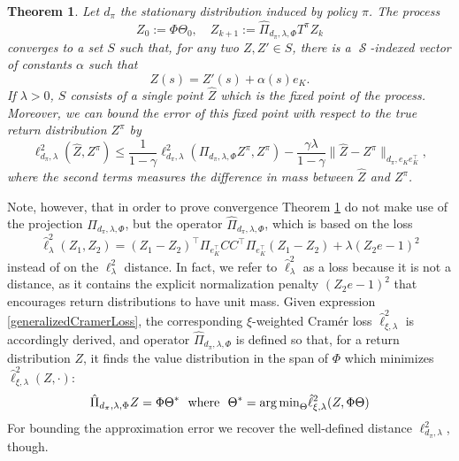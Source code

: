 \documentclass[12pt,a4paper,openright,twoside]{article}
\DeclareMathOperator*{\Sspace}{\mathcal{S}}
\numberwithin{equation}{section}
\newtheorem{theorem}{Theorem}[section]
\theoremstyle{definition}
\theoremstyle{remark}
\theoremstyle{plain}
\begin{document}
\begin{theorem} \label{convergenceLinearCDRL}
	Let $d_\pi$ the stationary distribution induced by policy $\pi$. The process
	\begin{equation*}
		Z_0 := \Phi \Theta_0, \quad Z_{k+1} := \hat{\Pi}_{d_\pi,\lambda,\Phi} T^\pi Z_k
	\end{equation*}
	converges to a set $S$ such that, for any two $Z, Z' \in S$, there is a $\Sspace$-indexed vector of constants $\alpha$ such that
	\begin{equation*}
		Z(s) = Z'(s) + \alpha(s)e_K.
	\end{equation*}
	If $\lambda > 0$, $S$ consists of a single point $\hat{Z}$ which is the fixed point of the process. Moreover, we can bound the error of this fixed point with respect to the true return distribution $Z^\pi$ by
	\begin{equation*}
		\ell^2_{d_\pi, \lambda} (\hat{Z}, Z^\pi) \leq \frac{1}{1-\gamma} \ell^2_{d_\pi, \lambda} (\Pi_{d_\pi,\lambda,\Phi} Z^\pi, Z^\pi) - \frac{\gamma \lambda}{1-\gamma} \| \hat{Z} - Z^\pi \|_{d_\pi, e_Ke_K^\top},
	\end{equation*}
	where the second terms measures the difference in mass between $\hat{Z}$ and $Z^\pi$.
\end{theorem}


Note, however, that in order to prove convergence Theorem \ref{convergenceLinearCDRL} do not make use of the projection $\Pi_{d_\pi,\lambda,\Phi}$, but the operator $\hat{\Pi}_{d_\pi,\lambda,\Phi}$, which is based on the loss
\begin{equation} \label{generalizedCramerLoss}
	\hat{\ell}_{\lambda}^2(Z_1,Z_2) = (Z_1 - Z_2)^\top \Pi_{e_K^\top} C C^\top \Pi_{e_K^\top} (Z_1 - Z_2) + \lambda (Z_2 e -1)^2 
\end{equation}
instead of on the $\ell^2_\lambda$ distance. In fact, we refer to $\hat{\ell}_{\lambda}^2$ as a loss because it is not a distance, as it contains the explicit normalization penalty $(Z_2 e -1)^2$ that encourages return distributions to have unit mass. Given expression \ref{generalizedCramerLoss}, the corresponding $\xi$-weighted Cramér loss $\hat{\ell}_{\xi, \lambda}^2$ is accordingly derived, and operator $\hat{\Pi}_{d_\pi,\lambda,\Phi}$ is defined so that, for a return distribution $Z$, it finds the value distribution in the span of $\Phi$ which minimizes $\hat{\ell}_{\xi, \lambda}^2(Z, \cdot)$:
\begin{equation} \label{operatorCramérLoss}
	\hat{\Pi}_{d_\pi,\lambda,\Phi} Z = \Phi \Theta^* \ \textnormal{ where } \ \Theta^* = {\arg \min}_{\Theta} \hat{\ell}_{\xi, \lambda}^2(Z, \Phi \Theta)
\end{equation}
For bounding the approximation error we recover the well-defined distance $\ell^2_{d_\pi, \lambda}$, though.
\end{document}
